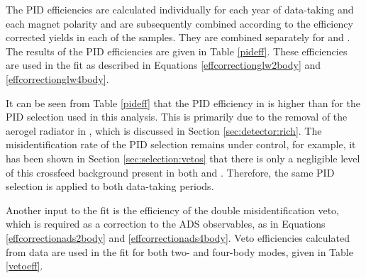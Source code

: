 The PID efficiencies are calculated individually for each year of data-taking and each magnet polarity and are subsequently combined according to the efficiency corrected yields in each of the samples. They are combined separately for \runone and \runtwo. The results of the PID efficiencies are given in Table \ref{pideff}. These efficiencies are used in the \CP fit as described in Equations \ref{effcorrectionglw2body} and \ref{effcorrectionglw4body}. 

\begin{table}[h]
\centering
{}
\caption{Summary of the PID efficiencies used in the \CP fit.}
\label{pideff}
\end{table}

It can be seen from Table \ref{pideff} that the PID efficiency in \runtwo is higher than \runone for the PID selection used in this analysis. This is primarily due to the removal of the aerogel radiator in \runtwo, which is discussed in Section \ref{sec:detector:rich}. The misidentification rate of the PID selection remains under control, for example, it has been shown in Section \ref{sec:selection:vetos} that there is only a negligible level of this crossfeed background present in both \runone and \runtwo. Therefore, the same PID selection is applied to both data-taking periods.

Another input to the fit is the efficiency of the double misidentification veto, which is required as a correction to the ADS observables, as in Equations \ref{effcorrectionads2body} and \ref{effcorrectionads4body}. Veto efficiencies calculated from data are used in the \CP fit for both two- and four-body modes, given in Table \ref{vetoeff}.

